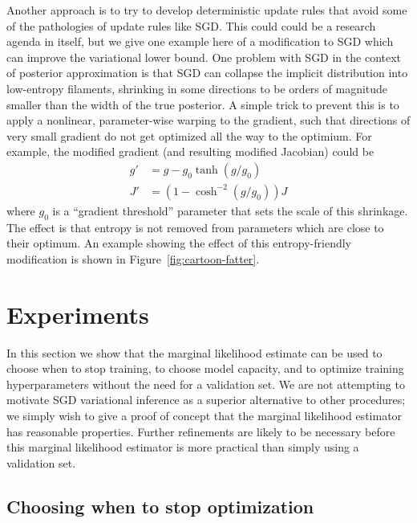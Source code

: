 \documentclass[]{article}
\begin{document}
Another approach is to try to develop deterministic update rules
that avoid some of the pathologies of update rules like SGD.
This could could be a research agenda in itself, but we give one example here of a modification to
SGD which can improve the variational lower bound.
One problem with SGD in the context of posterior approximation is that
SGD can collapse the implicit distribution into low-entropy filaments, shrinking in some directions to be orders of magnitude smaller than the width of the true posterior.
A simple trick to prevent this is to apply a nonlinear, parameter-wise warping
to the gradient, such that directions of very small gradient do not get optimized all the way
to the optimium.
For example, the modified gradient (and resulting modified Jacobian) could be
\begin{align}
g' & = g - g_0 \tanh \left(g / g_0 \right) \\
J' & = \left(1 - \cosh^{-2} (g / g_0) \right) J 
\end{align}
where $g_0$ is a ``gradient threshold'' parameter that sets the scale of this shrinkage.
The effect is that entropy is not removed from parameters which are close to their optimum.
An example showing the effect of this entropy-friendly modification is shown in Figure~\ref{fig:cartoon-fatter}.


\section{Experiments}
\label{sec:experiments}

In this section we show that the marginal likelihood estimate can be used to choose when to stop training, to choose model capacity, and to optimize training hyperparameters without the need for a validation set.
We are not attempting to motivate SGD variational inference as a superior alternative to other procedures;
we simply wish to give a proof of concept that the marginal likelihood estimator has reasonable properties.
Further refinements are likely to be necessary before this marginal likelihood estimator is more practical than simply using a validation set.

\subsection{Choosing when to stop optimization}
\end{document}
